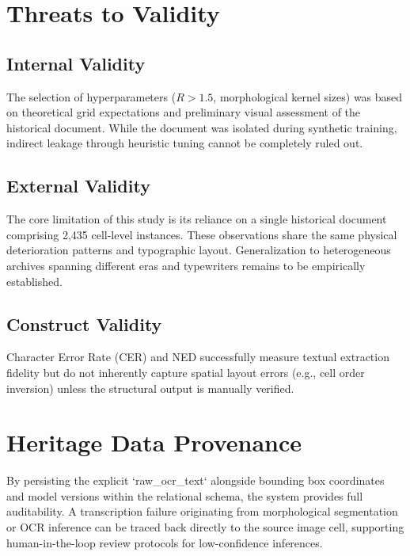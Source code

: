 \documentclass[pdflatex,sn-mathphys-num]{sn-jnl}
\begin{document}
\section{Threats to Validity}
\label{sec:threats}

\subsection{Internal Validity}
The selection of hyperparameters ($R > 1.5$, morphological kernel sizes) was based on theoretical grid expectations and preliminary visual assessment of the historical document. While the document was isolated during synthetic training, indirect leakage through heuristic tuning cannot be completely ruled out.

\subsection{External Validity}
The core limitation of this study is its reliance on a single historical document comprising 2,435 cell-level instances. These observations share the same physical deterioration patterns and typographic layout. Generalization to heterogeneous archives spanning different eras and typewriters remains to be empirically established.

\subsection{Construct Validity}
Character Error Rate (CER) and NED successfully measure textual extraction fidelity but do not inherently capture spatial layout errors (e.g., cell order inversion) unless the structural output is manually verified.


\section{Heritage Data Provenance}
\label{sec:provenance}
By persisting the explicit `raw\_ocr\_text` alongside bounding box coordinates and model versions within the relational schema, the system provides full auditability. A transcription failure originating from morphological segmentation or OCR inference can be traced back directly to the source image cell, supporting human-in-the-loop review protocols for low-confidence inferences.
\end{document}
